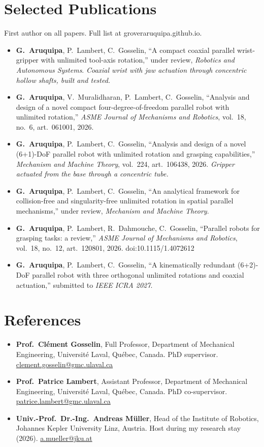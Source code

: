 \documentclass[10pt,a4paper]{article}
\begin{document}
\section{Selected Publications}
{\small First author on all papers. Full list at groveraruquipa.github.io.}\par\vspace{2pt}
\begin{itemize}
\item \textbf{G.~Aruquipa}, P.~Lambert, C.~Gosselin, ``A compact coaxial parallel wrist-gripper with unlimited
tool-axis rotation,'' under review, \emph{Robotics and Autonomous Systems}. \emph{Coaxial wrist with jaw actuation
through concentric hollow shafts, built and tested.}
\item \textbf{G.~Aruquipa}, V.~Muralidharan, P.~Lambert, C.~Gosselin, ``Analysis and design of a novel compact
four-degree-of-freedom parallel robot with unlimited rotation,'' \emph{ASME Journal of Mechanisms and Robotics},
vol.~18, no.~6, art.~061001, 2026.
\item \textbf{G.~Aruquipa}, P.~Lambert, C.~Gosselin, ``Analysis and design of a novel (6+1)-DoF parallel robot with
unlimited rotation and grasping capabilities,'' \emph{Mechanism and Machine Theory}, vol.~224, art.~106438, 2026.
\emph{Gripper actuated from the base through a concentric tube.}
\item \textbf{G.~Aruquipa}, P.~Lambert, C.~Gosselin, ``An analytical framework for collision-free and singularity-free
unlimited rotation in spatial parallel mechanisms,'' under review, \emph{Mechanism and Machine Theory}.
\item \textbf{G.~Aruquipa}, P.~Lambert, R.~Dahmouche, C.~Gosselin, ``Parallel robots for grasping tasks: a review,''
\emph{ASME Journal of Mechanisms and Robotics}, vol.~18, no.~12, art.~120801, 2026. doi:10.1115/1.4072612
\item \textbf{G.~Aruquipa}, P.~Lambert, C.~Gosselin, ``A kinematically redundant (6+2)-DoF parallel robot with three
orthogonal unlimited rotations and coaxial actuation,'' submitted to \emph{IEEE ICRA 2027}.
\end{itemize}

\section{References}
\begin{itemize}
\item \textbf{Prof.~Cl\'ement Gosselin}, Full Professor, Department of Mechanical Engineering, Universit\'e Laval, Qu\'ebec,
Canada. PhD supervisor. \href{mailto:clement.gosselin@gmc.ulaval.ca}{clement.gosselin@gmc.ulaval.ca}
\item \textbf{Prof.~Patrice Lambert}, Assistant Professor, Department of Mechanical Engineering, Universit\'e Laval,
Qu\'ebec, Canada. PhD co-supervisor. \href{mailto:patrice.lambert@gmc.ulaval.ca}{patrice.lambert@gmc.ulaval.ca}
\item \textbf{Univ.-Prof.~Dr.-Ing.~Andreas M\"uller}, Head of the Institute of Robotics, Johannes Kepler University Linz,
Austria. Host during my research stay (2026). \href{mailto:a.mueller@jku.at}{a.mueller@jku.at}
\end{itemize}
\end{document}
